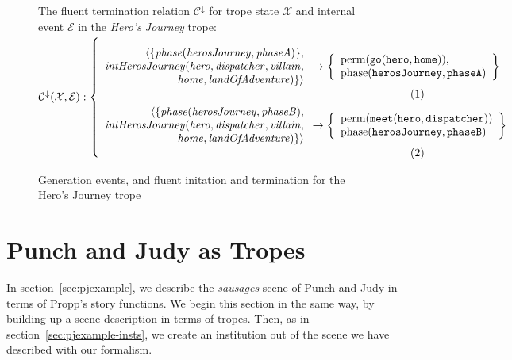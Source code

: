 \begin{figure}[!t]
The fluent termination relation $\mathcal{C^{\downarrow}}$ for trope state $\mathcal{X}$ and internal event $\mathcal{E}$ in the \emph{Hero's Journey} trope:\\
$\mathcal{C^{\downarrow} (X, E)}:\left\{\mbox{%
\begin{minipage}[c]{0.85\textwidth}
\begin{align}
\begin{array}{r}
                                 \langle \{\mathit{phase(herosJourney, phaseA)}\},\\
  \mathit{intHerosJourney(hero, dispatcher, villain},\\ \mathit{home, landOfAdventure)}\} \rangle
  \end{array}
&\rightarrow \left\{
\begin{array}{l}\text{perm}(\mathtt{go(hero, home)}),\\
\text{phase}(\mathtt{herosJourney, phaseA})
\end{array}
\right\}\label{eq:crt}\\
\begin{array}{r}
                                 \langle\{\mathit{phase(herosJourney, phaseB)},\\
  \mathit{intHerosJourney(hero, dispatcher, villain},\\ \mathit{home, landOfAdventure)}\} \rangle
  \end{array}
&\rightarrow \left\{
\begin{array}{l}
\text{perm}(\mathtt{meet(hero, dispatcher)})\\
\text{phase}(\mathtt{herosJourney, phaseB})
\end{array}
\right\}\label{eq:crst}
\end{align}
\end{minipage}
}\right.$
\caption{Generation events, and fluent initation and termination for the Hero's Journey trope}
\label{fig:gen}
\label{fig:init}
\label{fig:term}
\end{figure}

\section{Punch and Judy as Tropes}
\label{sec:punchjudy-tropes}
In section~\ref{sec:pjexample}, we describe the \emph{sausages} scene of Punch
and Judy in terms of Propp's story functions. We begin this section in the same
way, by building up a scene description in terms of tropes. Then, as in
section~\ref{sec:pjexample-insts}, we create an institution out of the scene we
have described with our formalism. 

